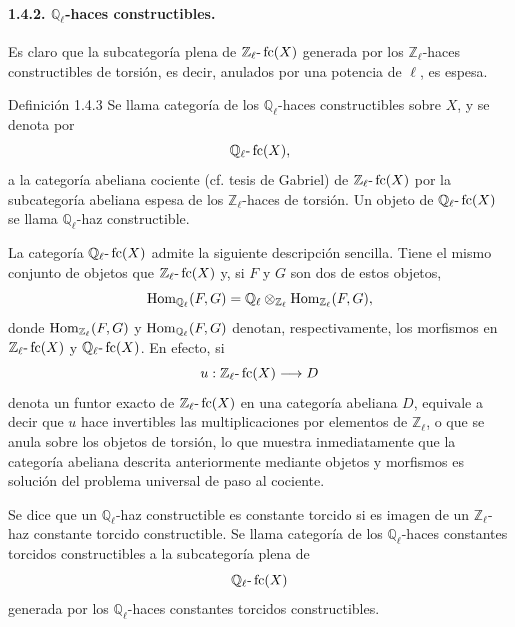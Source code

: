 \paragraph{1.4.2. \(\mathbb Q_\ell\)-haces constructibles.}
Es claro que la subcategoría plena de \(\mathbb Z_\ell\text{-}\operatorname{fc}(X)\) generada por los \(\mathbb Z_\ell\)-haces constructibles de torsión, es decir, anulados por una potencia de \(\ell\), es espesa.

\begin{statement}{Definición 1.4.3}
Se llama categoría de los \(\mathbb Q_\ell\)-haces constructibles sobre \(X\), y se denota por
\[
\mathbb Q_\ell\text{-}\operatorname{fc}(X),
\]
a la categoría abeliana cociente (cf. tesis de Gabriel) de \(\mathbb Z_\ell\text{-}\operatorname{fc}(X)\) por la subcategoría abeliana espesa de los \(\mathbb Z_\ell\)-haces de torsión. Un objeto de \(\mathbb Q_\ell\text{-}\operatorname{fc}(X)\) se llama \(\mathbb Q_\ell\)-haz constructible.
\end{statement}

La categoría \(\mathbb Q_\ell\text{-}\operatorname{fc}(X)\) admite la siguiente descripción sencilla. Tiene el mismo conjunto de objetos que \(\mathbb Z_\ell\text{-}\operatorname{fc}(X)\) y, si \(F\) y \(G\) son dos de estos objetos,
\[
\operatorname{Hom}_{\mathbb Q_\ell}(F,G)
=\mathbb Q_\ell\otimes_{\mathbb Z_\ell}\operatorname{Hom}_{\mathbb Z_\ell}(F,G),
\]
donde \(\operatorname{Hom}_{\mathbb Z_\ell}(F,G)\) y \(\operatorname{Hom}_{\mathbb Q_\ell}(F,G)\) denotan, respectivamente, los morfismos en \(\mathbb Z_\ell\text{-}\operatorname{fc}(X)\) y \(\mathbb Q_\ell\text{-}\operatorname{fc}(X)\). En efecto, si
\[
u:\mathbb Z_\ell\text{-}\operatorname{fc}(X)\longrightarrow D
\]
denota un funtor exacto de \(\mathbb Z_\ell\text{-}\operatorname{fc}(X)\) en una categoría abeliana \(D\), equivale a decir que \(u\) hace invertibles las multiplicaciones por elementos de \(\mathbb Z_\ell\), o que se anula sobre los objetos de torsión, lo que muestra inmediatamente que la categoría abeliana descrita anteriormente mediante objetos y morfismos es solución del problema universal de paso al cociente.

Se dice que un \(\mathbb Q_\ell\)-haz constructible es constante torcido si es imagen de un \(\mathbb Z_\ell\)-haz constante torcido constructible. Se llama categoría de los \(\mathbb Q_\ell\)-haces constantes torcidos constructibles a la subcategoría plena de
\[
\mathbb Q_\ell\text{-}\operatorname{fc}(X)
\]
generada por los \(\mathbb Q_\ell\)-haces constantes torcidos constructibles.


